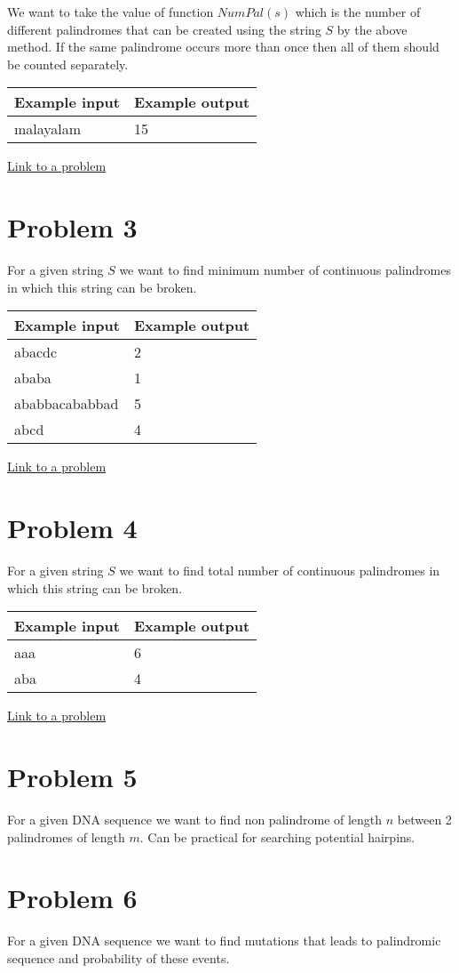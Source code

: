 \documentclass[12pt]{article}
\begin{document}
We want to take the value of function $NumPal(s)$ which is the number of different palindromes that can be created using the string $S$ by the above method. If the same palindrome occurs more than once then all of them should be counted separately.
\begin{table}[H]
\begin{tabular}{|l|l|}
\hline
Example input & Example output \\ \hline
malayalam     & 15             \\ \hline
\end{tabular}
\end{table}
\href{https://www.spoj.com/problems/NUMOFPAL/}{\underline{Link to a problem}}
\section*{Problem 3}
For a given string $S$ we want to find minimum number of continuous palindromes in which this string can be broken. 
\begin{table}[H]
\begin{tabular}{|l|l|}
\hline
Example input  & Example output \\ \hline
abacdc         & 2              \\ \hline
ababa          & 1              \\ \hline
ababbacababbad & 5              \\ \hline
abcd           & 4              \\ \hline
\end{tabular}
\end{table}
\href{https://www.spoj.com/problems/IITKWPCE/}{\underline{Link to a problem}}
\section*{Problem 4}
For a given string $S$ we want to find total number of continuous palindromes in which this string can be broken.
\begin{table}[H]
\begin{tabular}{|l|l|}
\hline
Example input & Example output \\ \hline
aaa           & 6              \\ \hline
aba           & 4              \\ \hline
\end{tabular}
\end{table}
\href{https://informatics.mccme.ru//mod/statements/view.php?chapterid=1750}{\underline{Link to a problem}}
\section*{Problem 5}
For a given DNA sequence we want to find non palindrome of length $n$ between 2 palindromes of length $m$. Can be practical for searching potential hairpins.
\section*{Problem 6}
For a given DNA sequence we want to find mutations that leads to palindromic sequence and probability of these events.
\end{document}
